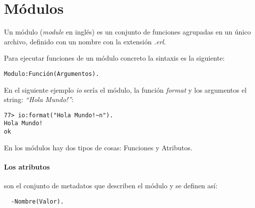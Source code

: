 
\section{Módulos}

Un módulo (\textit{module} en inglés) es un conjunto de funciones agrupadas en un único archivo, definido con
un nombre con la extensión \textit{.erl}.

Para ejecutar funciones de un módulo concreto la sintaxis es la siguiente:

\begin{verbatim}
Modulo:Función(Argumentos).
\end{verbatim}

En el siguiente ejemplo \textit{io} sería el módulo, la función \textit{format} y los argumentos el string:
\textit{``Hola Mundo!''}:
\begin{lstlisting}
77> io:format("Hola Mundo!~n").
Hola Mundo!
ok
\end{lstlisting}

En los módulos hay dos tipos de cosas: Funciones y Atributos.

\paragraph{Los atributos} son el conjunto de metadatos que describen el módulo y se definen así:
  \begin{verbatim}
  -Nombre(Valor).
  \end{verbatim}

